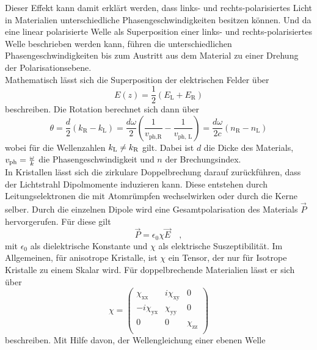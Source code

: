 \noindent
Dieser Effekt kann damit erklärt werden, dass links- und rechts-polarisiertes Licht in Materialien unterschiedliche Phasengeschwindigkeiten besitzen können.
Und da eine linear polarisierte Welle als Superposition einer links- und rechts-polarisiertes Welle beschrieben werden kann, 
führen die unterschiedlichen Phasengeschwindigkeiten bis zum Austritt aus dem Material zu 
einer Drehung der Polarisationsebene.\\
Mathematisch lässt sich die Superposition der elektrischen Felder über 
\begin{equation*}
    E\left(z\right) = \frac{1}{2}\left(E_\text{L}+E_\text{R}\right)
\end{equation*}
beschreiben. 
Die Rotation berechnet sich dann über
\begin{equation}
    \theta = \frac{d}{2}\left(k_\text{R}-k_\text{L}\right) = \frac{d\omega}{2}\left(\frac{1}{v_\text{ph,R}}-\frac{1}{v_\text{ph, L}}\right) = \frac{d\omega}{2c}\left(n_\text{R}-n_\text{L}\right)
    \label{eqn:theta}
\end{equation} 
wobei für die Wellenzahlen $k_{\text{L}} \neq k_{\text{R}}$ gilt. 
Dabei ist $d$ die Dicke des Materials, $v_{\text{ph}} = \frac{\omega}{k}$ die Phasengeschwindigkeit und $n$ der Brechungsindex.\\
In Kristallen lässt sich die zirkulare Doppelbrechung darauf zurückführen, dass der Lichtstrahl Dipolmomente induzieren kann.
Diese entstehen durch Leitungselektronen die mit Atomrümpfen wechselwirken oder durch die Kerne selber.
Durch die einzelnen Dipole wird eine Gesamtpolarisation des Materials $\vec{P}$ hervorgerufen.
Für diese gilt
\begin{equation*}
    \vec{P} = \epsilon_0 \chi \vec{E} \quad,
\end{equation*}
mit $\epsilon_0$ als dielektrische Konstante und $\chi$ als elektrische Suszeptibilität. 
Im Allgemeinen, für anisotrope Kristalle, ist $\chi$ ein Tensor, der nur für Isotrope Kristalle zu einem Skalar wird.
Für doppelbrechende Materialien lässt er sich über
\begin{equation}
    \chi = \left( \begin{array}{rrr}\chi_\text{xx} & i\chi_\text{xy} & 0 \\-i\chi_\text{yx} & \chi_\text{yy} & 0\\0 & 0 & \chi_\text{zz}\\\end{array}\right)
    \label{eqn:chi}
\end{equation}
beschreiben. Mit Hilfe davon, der Wellengleichung einer ebenen Welle 
